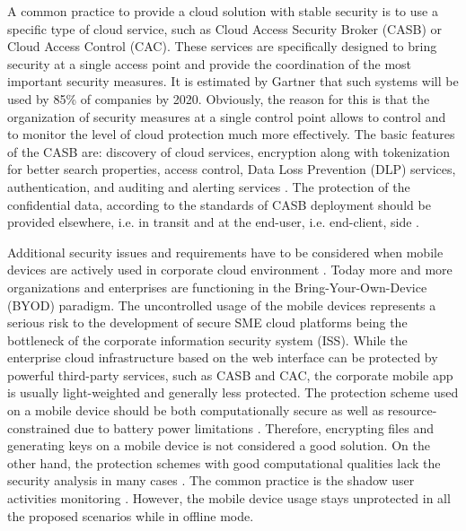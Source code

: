 \documentclass[twocolumn]{svjour3}          	%
\begin{document}
A common practice to provide a cloud solution with stable security is to use a specific type of cloud service, such as Cloud Access Security Broker (CASB) or Cloud Access Control (CAC). These services are specifically designed to bring security at a single access point and provide the coordination of the most important security measures. It is estimated by Gartner \cite{skyhigh2015} that such systems will be used by 85\%  of companies by 2020. Obviously, the reason for this is that the organization of security measures at a single control point allows to control and to monitor the level of cloud protection much more effectively. The basic features of the CASB are: discovery of cloud services, encryption along with tokenization for better search properties, access control, Data Loss Prevention (DLP) services, authentication, and auditing and alerting services \cite{lawson2015}. The protection of the confidential data, according to the standards of CASB deployment should be provided elsewhere, i.e. in transit and at the end-user, i.e. end-client, side \cite{campbell2015}.

Additional security issues and requirements have to be considered when mobile devices are actively used in corporate cloud environment \cite{yovel2014}. Today more and more organizations and enterprises are functioning in the Bring-Your-Own-Device (BYOD) paradigm. The uncontrolled usage of the mobile devices represents a serious risk to the development of secure SME cloud platforms being the bottleneck of the corporate information security system (ISS). While the enterprise cloud infrastructure based on the web interface can be protected by powerful third-party services, such as CASB and CAC, the corporate mobile app is usually light-weighted and generally less protected. The protection scheme used on a mobile device should be both computationally secure as well as resource-constrained due to battery power limitations \cite{khan2015cloud}. Therefore, encrypting files and generating keys on a mobile device is not considered a good solution. On the other hand, the protection schemes with good computational qualities lack the security analysis in many cases \cite{khan2014bss}. The common practice is the shadow user activities monitoring \cite{yovel2014}. However, the mobile device usage stays unprotected in all the proposed scenarios while in offline mode.
\end{document}
